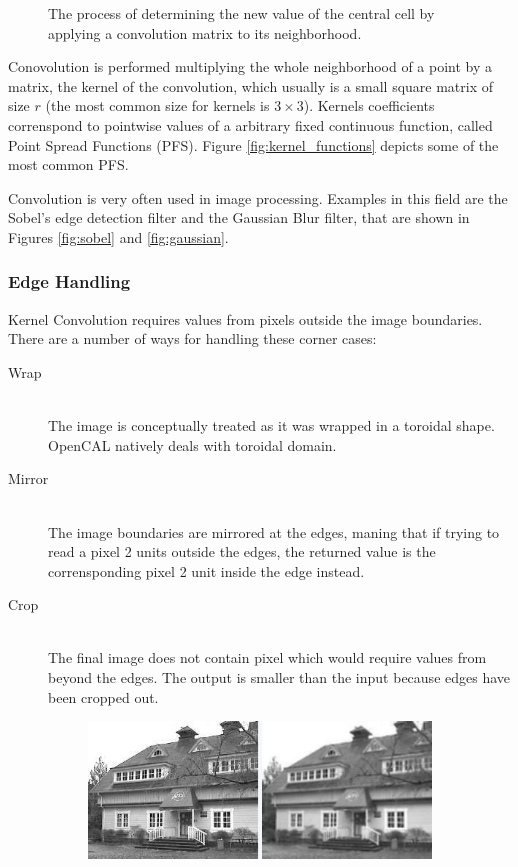 {\begin{figure}
\begin{center}
		\caption{The process of determining the new value of the central cell by applying a convolution matrix to its neighborhood.}
		\label{fig:convolution}
	\end{center}
\end{figure}
Conovolution is performed multiplying the whole neighborhood of a point by a  matrix, the kernel of the convolution, which usually is a small square matrix of size $r$ (the most common size for kernels is $3\times 3$).
Kernels coefficients correnspond to pointwise values of a arbitrary fixed continuous function, called Point Spread Functions (PFS). Figure \ref{fig:kernel_functions} depicts some of the most common PFS.

Convolution is very often used in image processing. Examples in this field are the Sobel's edge detection filter and the Gaussian Blur filter, that are shown in Figures \ref{fig:sobel} and \ref{fig:gaussian}.

\subsubsection{Edge Handling}
Kernel Convolution requires values from pixels outside the image boundaries. There are a number of ways for handling these corner cases:
\begin{description}
    \item[Wrap] \hfill \\The image is conceptually treated as it was wrapped in a toroidal shape. OpenCAL natively deals with toroidal domain.
    \item[Mirror] \hfill \\
    The image boundaries are mirrored at the edges, maning that if trying to read a pixel 2 units outside the edges, the returned value is the corrensponding pixel 2 unit inside the edge instead.
    \item [Crop]\hfill \\
    	The final image does not contain pixel which would require values from beyond the edges. The output is smaller than the input because edges have been cropped out.
\end{description}

\begin{figure}
	\begin{subfigure}{1.0\textwidth}
		\includegraphics[width=\linewidth]{./images/opencal/gaussian_example}
		

\end{subfigure}
\end{figure}}
